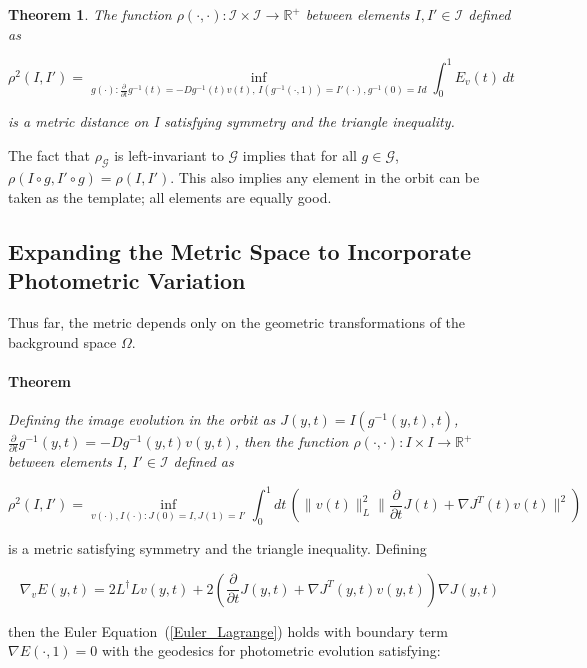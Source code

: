 \documentclass[final, paper=letter,5p,times,twocolumn]{elsarticle}
\newtheorem{theorem}{Theorem} %
\theoremstyle{definition}
\begin{document}
{\begin{theorem}
The function $\rho(\cdot, \cdot): \mathcal{I} \times \mathcal{I} \rightarrow \mathbb{R}^{+}$ between elements $I, I' \in \mathcal{I}$ defined as

\begin{equation}
\rho^{2}(I,I') = \underset{g(\cdot):\frac{\partial}{\partial t}g^{-1}(t) = -Dg^{-1}(t)v(t),\, I(g^{-1}(\cdot,1)) = I'(\cdot), g^{-1}(0) = Id}{\inf} \int_{0}^{1} E_{v}(t) \, dt
\end{equation}

is a metric distance on I satisfying symmetry and the triangle inequality.
\end{theorem}


The fact that $\rho_{\mathcal{G}}$ is left-invariant to $\mathcal{G}$ implies that for all $g \in \mathcal{G}$, $\rho(I \circ g, I' \circ g) = ρ(I, I')$. This also implies any element in the orbit can be taken as the template; all elements are equally good.

\subsection{Expanding the Metric Space to Incorporate Photometric Variation}

Thus far, the metric depends only on the geometric transformations of the background space $\Omega$.

\paragraph{Theorem}{\it Defining the image evolution in the orbit as $J(y, t) = I(g^{−1}(y, t), t)$, $\frac{\partial}{\partial t} g^{-1}(y, t) = −Dg^{−1}(y, t)v(y, t)$, then the function $\rho(\cdot, \cdot): I \times I \rightarrow \mathbb{R}^{+}$ between elements $I$, $I' \in \mathcal{I}$ defined as 

$$
\rho^{2}(I,I') = \underset{v(\cdot),I(\cdot):J(0) = I, J(1) = I'}{\inf} \int_{0}^{1} dt \, \left( \| v(t) \|_{L}^{2} \| \frac{\partial }{\partial t} J(t) + \nabla J^{T} (t)v(t)\|^{2} \right)
$$

is a metric satisfying symmetry and the triangle inequality. Defining

$$
\nabla_{v}E(y,t) = 2L^{\dag}Lv(y,t) + 2 \left( \frac{\partial}{\partial t} J(y,t) + \nabla J^{T}(y,t) v(y,t) \right) \nabla J(y,t)
$$

then the Euler Equation~(\ref{Euler_Lagrange}) holds with boundary term $\nabla E (\cdot, 1) = 0$ with the geodesics for photometric evolution satisfying:

}}
\end{document}
